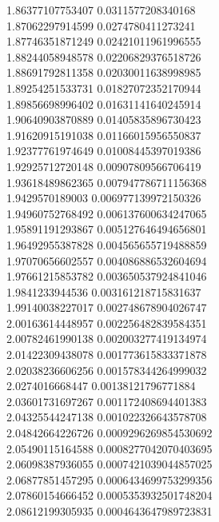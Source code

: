 {1.86377107753407 0.0311577208340168 \\
1.87062297914599 0.0274780411273241 \\
1.87746351871249 0.02421011961996555 \\
1.88244058948578 0.02206829376518726 \\
1.88691792811358 0.02030011638998985 \\
1.89254251533731 0.01827072352170944 \\
1.89856698996402 0.01631141640245914 \\
1.90640903870889 0.01405835896730423 \\
1.91620915191038 0.01166015956550837 \\
1.92377761974649 0.01008445397019386 \\
1.92925712720148 0.00907809566706419 \\
1.93618489862365 0.007947786711156368 \\
1.9429570189003 0.006977139972150326 \\
1.94960752768492 0.006137600634247065 \\
1.95891191293867 0.005127646494656801 \\
1.96492955387828 0.004565655719488859 \\
1.97070656602557 0.004086886532604694 \\
1.97661215853782 0.003650537924841046 \\
1.9841233944536 0.003161218715831637 \\
1.99140038227017 0.002748678904026747 \\
2.00163614448957 0.002256482839584351 \\
2.00782461990138 0.002003277419134974 \\
2.01422309438078 0.001773615833371878 \\
2.02038236606256 0.001578344264999032 \\
2.0274016668447 0.00138121796771884 \\
2.03601731697267 0.001172408694401383 \\
2.04325544247138 0.001022326643578708 \\
2.04842664226726 0.0009296269854530692 \\
2.05490115164588 0.0008277042070403695 \\
2.06098387936055 0.0007421039044857025 \\
2.06877851457295 0.0006434699753299356 \\
2.07860154666452 0.0005353932501748204 \\
2.08612199305935 0.0004643647989723831 \\
}
